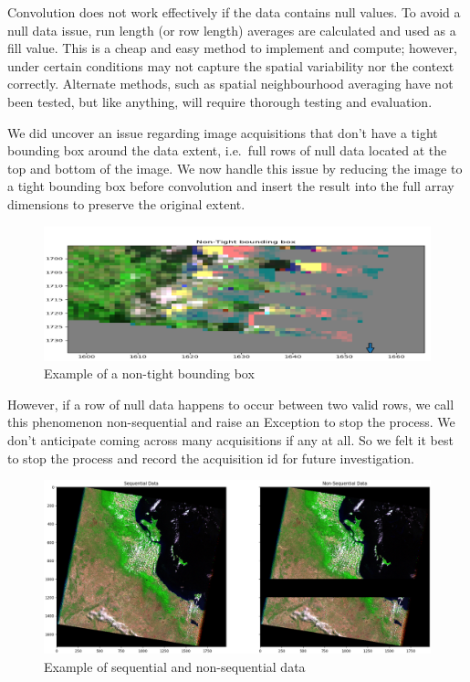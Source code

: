 \documentclass[a4paper]{article}
\begin{document}
    \begin{flushleft}
      Convolution does not work effectively if the data contains null values. To avoid a null data issue, run length (or row length) averages are calculated and used as a fill value. This is a cheap and easy method to implement and compute; however, under certain conditions may not capture the spatial variability nor the context correctly. Alternate methods, such as spatial neighbourhood averaging have not been tested, but like anything, will require thorough testing and evaluation. \par
      We did uncover an issue regarding image acquisitions that don't have a tight bounding box around the data extent, i.e.\ full rows of null data located at the top and bottom of the image. We now handle this issue by reducing the image to a tight bounding box before convolution and insert the result into the full array dimensions to preserve the original extent. \par

    \begin{figure}[h!]
      \centering
      \caption{Example of a non-tight bounding box}\label{fig:1}
      \includegraphics[scale=0.30]{non-tight-bounding-box.png}
    \end{figure}

      However, if a row of null data happens to occur between two valid rows, we call this phenomenon non-sequential and raise an Exception to stop the process. We don't anticipate coming across many acquisitions if any at all. So we felt it best to stop the process and record the acquisition id for future investigation. \par

    \begin{figure}[h!]
      \hspace*{-1.0cm}
      \centering
      \caption{Example of sequential and non-sequential data}\label{fig:2}
      \includegraphics[scale=0.30]{sequential-non-sequential-crop.png}
    \end{figure}


\end{flushleft}
\end{document}
